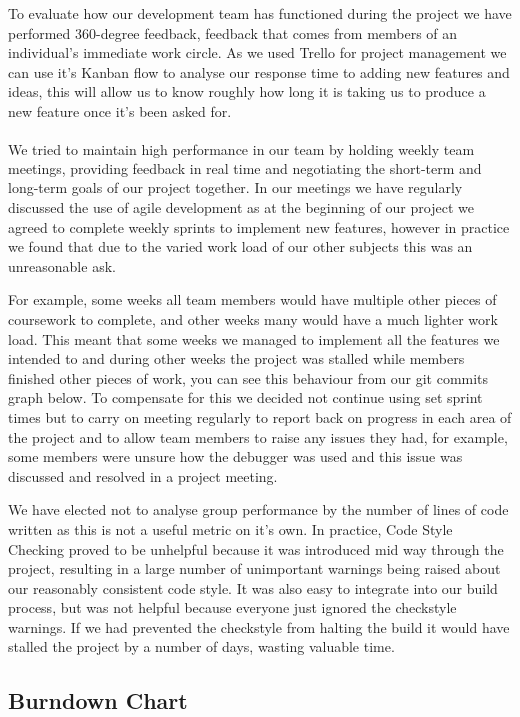 \documentclass[10pt, a4paper]{article}
\begin{document}
To evaluate how our development team has functioned during the project we have performed 360-degree feedback, feedback that comes from members of an individual’s immediate work circle. As we used Trello for project management we can use it’s Kanban flow to analyse our response time to adding new features and ideas, this will allow us to know roughly how long it is taking us to produce a new feature once it’s been asked for.

We tried to maintain high performance in our team\textsuperscript{\cite{semantia}} by holding weekly team meetings, providing feedback in real time and negotiating the short-term and long-term goals of our project together. In our meetings we have regularly discussed the use of agile development as at the beginning of our project we agreed to complete weekly sprints to implement new features, however in practice we found that due to the varied work load of our other subjects this was an unreasonable ask. 

For example, some weeks all team members would have multiple other pieces of coursework to complete, and other weeks many would have a much lighter work load. This meant that some weeks we managed to implement all the features we intended to and during other weeks the project was stalled while members finished other pieces of work, you can see this behaviour from our git commits graph below.
To compensate for this we decided not continue using set sprint times but to carry on meeting regularly to report back on progress in each area of the project and to allow team members to raise any issues they had, for example, some members were unsure how the debugger was used and this issue was discussed and resolved in a project meeting.

We have elected not to analyse group performance by the number of lines of code written as this is not a useful metric on it’s own. In practice, Code Style Checking proved to be unhelpful because it was introduced mid way through the project, resulting in a large number of unimportant warnings being raised about our reasonably consistent code style. It was also easy to integrate into our build process, but was not helpful because everyone just ignored the checkstyle warnings. If we had prevented the checkstyle from halting the build it would have stalled the project by a number of days, wasting valuable time.

\subsection{Burndown Chart}
\end{document}
